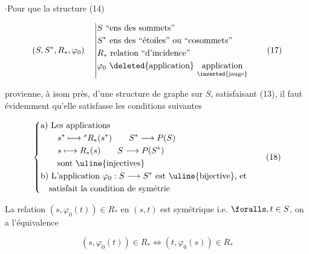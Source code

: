 
$\cdot$\quad Pour que la structure (14)

\[
 (S,S^*,R_*,\varphi_0)\quad\left|\begin{aligned}
 &S\ \text{``ens des sommets''}\\
 &S^*\ \text{ens des ``étoiles'' ou ``cosommets''}\\
 &R_*\ \text{relation ``d'incidence''}\\
 &\varphi_0\ \text{\deleted{application} }\underset{\inserted{\text{jauge}}}{\text{application}}
 \end{aligned}\right. \tag*{(17)}
\]

provienne, à isom près, d'une structure de graphe 
sur $S$,  satisfaisant (13), il faut évidemment
qu'elle satisfasse les conditions suivantes

\[
 \left\{\begin{aligned}
 &\text{a) Les applications}\\
 &\qquad s^*\longmapsto{}^sR_*(s^*)\qquad S^*\longrightarrow P(S)\\
 &\qquad s\longmapsto R_*(s)\qquad S\longrightarrow P(S^*)\\
 &\qquad\text{sont \uline{injectives}}\\
 &\text{b) L'application }\varphi_0:S\longrightarrow S^*\text{ est \uline{bijective}, et}\\
 &\quad\text{satisfait la condition de symétrie}
 \end{aligned}\right. \tag*{(18)}
\]

La relation $(s,\varphi_0(t))\in R_*$ en $(s,t)$ est symétrique
i.e. $\foralls,t\in S$, on a  l'équivalence

\[
 (s,\varphi_0(t))\in R_*\Longleftrightarrow(t,\varphi_0(s))\in R_* \tag*{(19)}
\]

